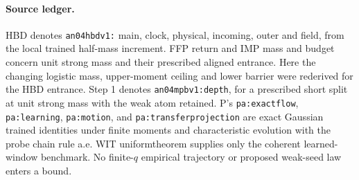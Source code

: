 \documentclass[11pt]{article}
\begin{document}
\paragraph{Source ledger.}
HBD denotes \texttt{an04hbdv1:} main, clock, physical, incoming,
outer and field, from the local trained half-mass increment.
FFP return and IMP mass and budget concern unit strong mass and
their prescribed aligned entrance. Here the changing logistic
mass, upper-moment ceiling and lower barrier were rederived for
the HBD entrance. Step 1 denotes \texttt{an04mpbv1:depth}, for
a prescribed short split at unit strong mass with the weak atom
retained. P's \texttt{pa:exactflow}, \texttt{pa:learning},
\texttt{pa:motion}, and \texttt{pa:transferprojection} are exact
Gaussian trained identities under finite moments and characteristic
evolution with the probe chain rule a.e. WIT uniformtheorem supplies
only the coherent learned-window benchmark. No finite-$q$ empirical
trajectory or proposed weak-seed law enters a bound.
\end{document}
